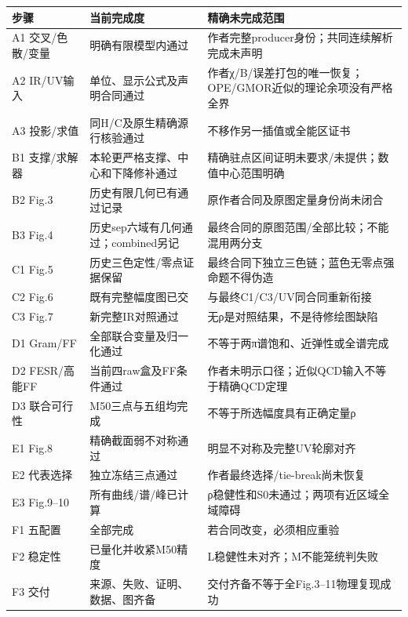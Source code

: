 \documentclass[
  10pt,
  a4paper,
]{article}
\newcounter{none} %
\begin{document}
{\def\LTcaptype{none} %
\begin{longtable}[]{@{}
  >{\raggedright\arraybackslash}p{}
  >{\raggedright\arraybackslash}p{}
  >{\raggedright\arraybackslash}p{}@{}}
\toprule\noalign{}
\begin{minipage}[b]{\linewidth}\raggedright
步骤
\end{minipage} & \begin{minipage}[b]{\linewidth}\raggedright
当前完成度
\end{minipage} & \begin{minipage}[b]{\linewidth}\raggedright
精确未完成范围
\end{minipage} \\
\midrule\noalign{}
\endhead
\bottomrule\noalign{}
\endlastfoot
A1 交叉/色散/变量 & 明确有限模型内通过 &
作者完整producer身份；共同连续解析完成未声明 \\
A2 IR/UV输入 & 单位、显示公式及声明合同通过 &
作者χ/B/误差打包的唯一恢复；OPE/GMOR近似的理论余项没有严格全界 \\
A3 投影/求值 & 同H/C及原生精确源行核验通过 &
不移作另一插值或全能区证书 \\
B1 支撑/求解器 & 本轮更严格支撑、中心和下降修补通过 &
精确驻点区间证明未要求/未提供；数值中心范围明确 \\
B2 Fig.3 & 历史有限几何已有通过记录 &
原作者合同及原图定量身份尚未闭合 \\
B3 Fig.4 & 历史sep六域有几何通过；combined另记 &
最终合同的原图范围/全部比较；不能混用两分支 \\
C1 Fig.5 & 历史三色定性/零点证据保留 &
最终合同下独立三色链；蓝色无零点强命题不得伪造 \\
C2 Fig.6 & 既有完整幅度图已交 & 与最终C1/C3/UV同合同重新衔接 \\
C3 Fig.7 & 新完整IR对照通过 & 无ρ是对照结果，不是待修绘图缺陷 \\
D1 Gram/FF & 全部联合变量及归一化通过 &
不等于两π谱饱和、近弹性或全谱完成 \\
D2 FESR/高能FF & 当前四raw盒及FF条件通过 &
作者未明示口径；近似QCD输入不等于精确QCD定理 \\
D3 联合可行性 & M50三点与五组均完成 & 不等于所选幅度具有正确定量ρ \\
E1 Fig.8 & 精确截面弱不对称通过 & 明显不对称及完整UV轮廓对齐 \\
E2 代表选择 & 独立冻结三点通过 & 作者最终选择/tie-break尚未恢复 \\
E3 Fig.9--10 & 所有曲线/谱/峰已计算 &
ρ稳健性和S0未通过；两项有近区域全域障碍 \\
F1 五配置 & 全部完成 & 若合同改变，必须相应重验 \\
F2 稳定性 & 已量化并收紧M50精度 & L稳健性未对齐；M不能笼统判失败 \\
F3 交付 & 来源、失败、证明、数据、图齐备 &
交付齐备不等于全Fig.3--11物理复现成功 \\
\end{longtable}
}
\end{document}
